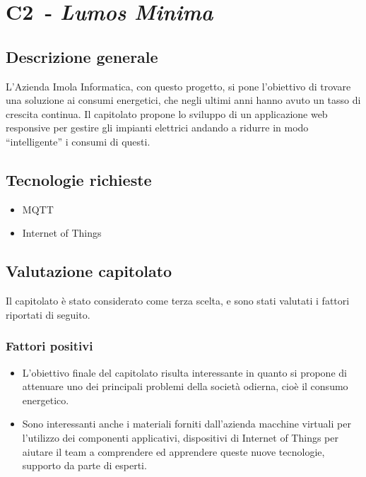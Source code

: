 
\renewcommand{\capName}{\textit{Lumos Minima}} %
\renewcommand{\capCode}{C2} %
\renewcommand{\capLink}{https://www.math.unipd.it/~tullio/IS-1/2022/Progetto/C2.pdf} %
\renewcommand{\capProposer}{ImolaInformatica} %


\section{\capCode\ - \capName} 
\subsection{Descrizione generale}
L'Azienda Imola Informatica, con questo progetto, si pone l'obiettivo di trovare una soluzione ai consumi energetici, che negli ultimi anni hanno avuto un tasso di crescita continua. Il capitolato propone lo sviluppo di un applicazione web responsive per gestire gli impianti elettrici andando a ridurre in modo “intelligente” i consumi di questi.
\subsection{Tecnologie richieste}
\begin{itemize}
    \item MQTT
    \item Internet of Things
\end{itemize}

\subsection{Valutazione capitolato}
Il capitolato è stato considerato come terza scelta, e sono stati valutati i fattori riportati di seguito.

\subsubsection{Fattori positivi}

\begin{itemize}
    \item L'obiettivo finale del capitolato risulta interessante in quanto si propone di attenuare uno dei principali problemi della società odierna, cioè il consumo energetico.
    \item Sono interessanti anche i materiali forniti dall'azienda macchine virtuali per l'utilizzo dei componenti applicativi, dispositivi di Internet of Things per aiutare il team a comprendere ed apprendere queste nuove tecnologie, supporto da parte di esperti.
\end{itemize}

